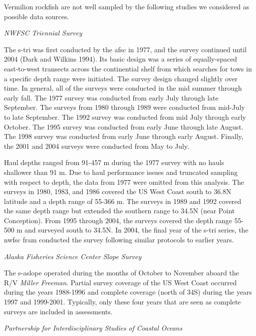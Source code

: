 \documentclass[11pt,
  english,
  a4paper,
]{article}
\begin{document}
\leavevmode\tagmcend\tagstructend

Vermilion rockfish are not well sampled by the following studies we considered as possible data sources.

\emph{NWFSC Triennial Survey}

The \gls{s-tri} was first conducted by the \gls{afsc} in 1977, and the survey continued until 2004 {(Dark and Wilkins 1994)\leavevmode\tagmcend\tagstructend}. Its basic design was a series of equally-spaced east-to-west transects across the continential shelf from which searches for tows in a specific depth range were initiated. The survey design changed slightly over time. In general, all of the surveys were conducted in the mid summer through early fall. The 1977 survey was conducted from early July through late September. The surveys from 1980 through 1989 were conducted from mid-July to late September. The 1992 survey was conducted from mid July through early October. The 1995 survey was conducted from early June through late August. The 1998 survey was conducted from early June through early August. Finally, the 2001 and 2004 surveys were conducted from May to July.

Haul depths ranged from 91-457 m during the 1977 survey with no hauls shallower than 91 m. Due to haul performance issues and truncated sampling with respect to depth, the data from 1977 were omitted from this analysis. The surveys in 1980, 1983, and 1986 covered the US West Coast south to 36.8\textdegree N latitude and a depth range of 55-366 m. The surveys in 1989 and 1992 covered the same depth range but extended the southern range to 34.5\textdegree N (near Point Conception). From 1995 through 2004, the surveys covered the depth range 55-500 m and surveyed south to 34.5\textdegree N. In 2004, the final year of the \gls{s-tri} series, the \gls{nwfsc} \gls{fram} conducted the survey following similar protocols to earlier years.

\emph{Alaska Fisheries Science Center Slope Survey}

The \gls{s-aslope} operated during the months of October to November aboard the R/V \emph{Miller Freeman}. Partial survey coverage of the US West Coast occurred during the years 1988-1996 and complete coverage (north of 34\textquotesingle S) during the years 1997 and 1999-2001. Typically, only these four years that are seen as complete surveys are included in assessments.

\emph{Partnership for Interdisciplinary Studies of Coastal Oceans}
\end{document}
